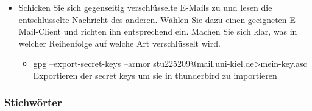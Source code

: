 \documentclass[12pt,a4paper]{article}
\begin{document}
\begin{itemize}
\begin{itemize}
    \end{itemize}
    \item Schicken Sie sich gegenseitig verschlüsselte E-Mails zu und lesen die entschlüsselte Nachricht des anderen. Wählen Sie dazu einen geeigneten E-Mail-Client und richten ihn entsprechend ein. Machen Sie sich klar, was in welcher Reihenfolge auf welche Art verschlüsselt wird.
    \begin{itemize}
        \item gpg --export-secret-keys --armor stu225209@mail.uni-kiel.de\textgreater mein-key.asc\\
        Exportieren der secret keys um sie in thunderbird zu importieren
    \end{itemize}

\end{itemize}
\subsubsection{Stichwörter}
\end{document}
